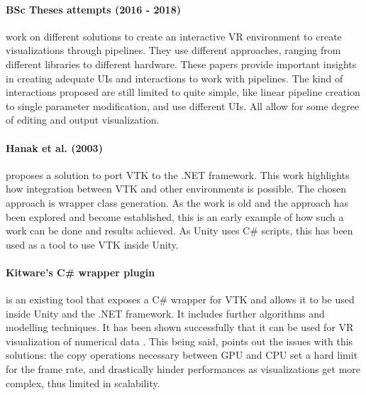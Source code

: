\paragraph{BSc Theses attempts (2016 - 2018) \cite{dreuning_visual_2016, kruis_creating_2017, shutte_virtual_2018}} work on different solutions to create an interactive VR environment to create visualizations through pipelines. They use different approaches, ranging from different libraries to different hardware. These papers provide important insights in creating adequate UIs and interactions to work with pipelines. The kind of interactions proposed are still limited to quite simple, like linear pipeline creation to single parameter modification, and use different UIs. All allow for some degree of editing and output visualization.

\paragraph{Hanak et al. (2003) \cite{hanak_opengl_2003}} proposes a solution to port VTK to the .NET framework. This work highlights how integration between VTK and other environments is possible. The chosen approach is wrapper class generation. As the work is old and the approach has been explored and become established, this is an early example of how such a work can be done and results achieved. As Unity uses C\# scripts, this has been used as a tool to use VTK inside Unity.

\paragraph{Kitware's C\# wrapper plugin \cite{noauthor_activiz_nodate, tamura_intuitive_2016}} is an existing tool that exposes a C\# wrapper for VTK and allows it to be used inside Unity and the .NET framework. It includes further algorithms and modelling techniques. It has been shown successfully that it can be used for VR visualization of numerical data \cite{tamura_intuitive_2016}. This being said, \cite{wheeler_virtual_2018} points out the issues with this solutions: the copy operations necessary between GPU and CPU set a hard limit for the frame rate, and drastically hinder performances as visualizations get more complex, thus limited in scalability.